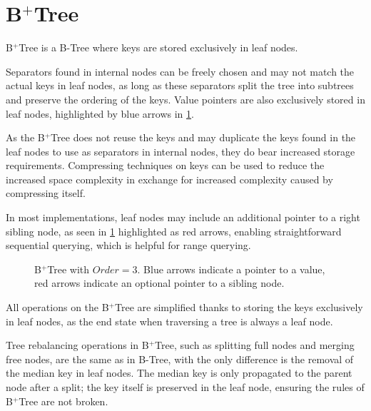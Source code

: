 \section{B$^+$Tree}

\begin{definition}
  B$^+$Tree is a B-Tree where keys are stored exclusively in leaf nodes.
\end{definition}

Separators found in internal nodes can be freely chosen and may not match the actual keys in leaf nodes, as long as these separators split the tree into subtrees and preserve the ordering of the keys. Value pointers are also exclusively stored in leaf nodes, highlighted by blue arrows in \cref{figure:b-plus-tree}.

As the B$^+$Tree does not reuse the keys and may duplicate the keys found in the leaf nodes to use as separators in internal nodes, they do bear increased storage requirements. Compressing techniques on keys can be used to reduce the increased space complexity in exchange for increased complexity caused by compressing itself.

In most implementations, leaf nodes may include an additional pointer to a right sibling node, as seen in \cref{figure:b-plus-tree} highlighted as red arrows, enabling straightforward sequential querying, which is helpful for range querying. 

\begin{figure}
  \centering
  
  \caption[B$^+$Tree with $\mathit{Order} = 3$.]{B$^+$Tree with $\mathit{Order} = 3$. Blue arrows indicate a pointer to a value, red arrows indicate an optional pointer to a sibling node.}
  \label{figure:b-plus-tree}
\end{figure}

All operations on the B$^+$Tree are simplified thanks to storing the keys exclusively in leaf nodes, as the end state when traversing a tree is always a leaf node.

Tree rebalancing operations in B$^+$Tree, such as splitting full nodes and merging free nodes, are the same as in B-Tree, with the only difference is the removal of the median key in leaf nodes. The median key is only propagated to the parent node after a split; the key itself is preserved in the leaf node, ensuring the rules of B$^+$Tree are not broken.
